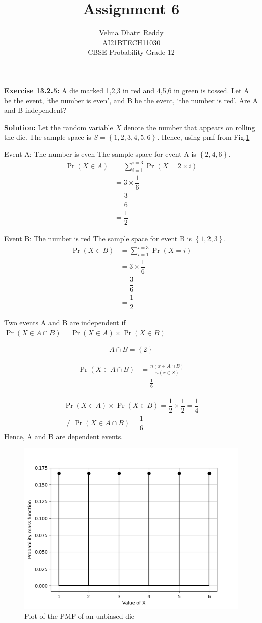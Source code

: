 \documentclass[journal,11pt,twocolumn]{IEEEtran}
\title{Assignment 6}
\author{Velma Dhatri Reddy \\ \normalsize AI21BTECH11030 \\ \vspace*{10pt} \Large CBSE Probability Grade 12}
\providecommand{\pr}[1]{\ensuremath{\Pr\left(#1\right)}}
\providecommand{\cbrak}[1]{\ensuremath{\left\{#1\right\}}}
\providecommand{\brak}[1]{\ensuremath{\left(#1\right)}}
\begin{document}
\maketitle
\textbf{Exercise 13.2.5:}
A die marked 1,2,3 in red and 4,5,6 in green is tossed. Let A be the event, ‘the number is even’, and B be the event, ‘the number is red’. Are A and B independent?

\textbf{Solution:} Let the random variable $X$ denote the number that appears on rolling the die. The sample space is $S = \cbrak{1, 2, 3, 4, 5, 6}$.
Hence, using pmf from Fig.\ref{fig:pmf}

Event A: The number is even
The sample space for event A is \cbrak{2,4,6}.
\begin{align}
    \pr{X \in A}&= \sum_{i = 1}^{i = 3}\pr{X = 2\times i}\\
    &= 3\times \dfrac{1}{6}\\
    &= \dfrac{3}{6}\\
    &= \dfrac{1}{2}
\end{align}

Event B: The number is red
The sample space for event B is \cbrak{1,2,3}.
\begin{align}
    \pr{X \in B}&= \sum_{i = 1}^{i = 3}\pr{X = i}\\
    &= 3\times \dfrac{1}{6}\\
    &= \dfrac{3}{6}\\
    &= \dfrac{1}{2}
\end{align}

Two events A and B are independent if 
$\pr{X \in A \cap B } = \pr{X \in A}\times\pr{X \in B}$

\begin{align}
    A \cap B = \cbrak{2}
\end{align}
    
\begin{align}
    \pr{X \in A \cap B} &= \frac{n\brak{x \in A \cap B}}{n\brak{x \in S}}\\
    &= \frac{1}{6}
\end{align}

\begin{multline}
    \pr{X \in A}\times\pr{X \in B} = \dfrac{1}{2}\times\dfrac{1}{2} = \dfrac{1}{4}\\
    \neq \pr{X \in A \cap B } = \dfrac{1}{6}
\end{multline}
Hence, A and B are dependent events.

\begin{figure}[!ht]
\centering
\includegraphics[width=\columnwidth]{figs/pmf.png}
\caption{Plot of the PMF of an unbiased die}
\label{fig:pmf}
\end{figure}
\end{document}
